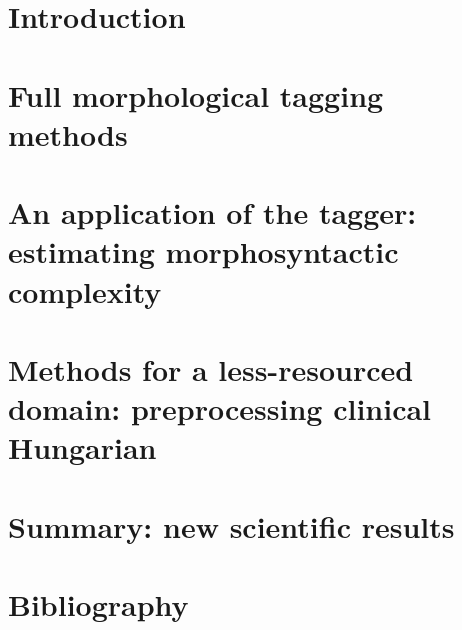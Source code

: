 \documentclass[a4paper,11pt,oneside,times,numbered,custommargin,custombib,PageStyleII]{Classes/PhDThesisPSnPDF}
\begin{document}
\mainmatter



\chapter{Introduction}



\chapter{Full morphological tagging methods}\label{chap:tagging}


\chapter{An application of the tagger: estimating morphosyntactic complexity}\label{chap:mlu}


\chapter{Methods for a less-resourced domain: preprocessing clinical Hungarian}\label{chap:clin}


\chapter{Summary: new scientific results}\label{chap:sum}


\chapter*{Bibliography}
\protect\thispagestyle{empty}



\end{document}
